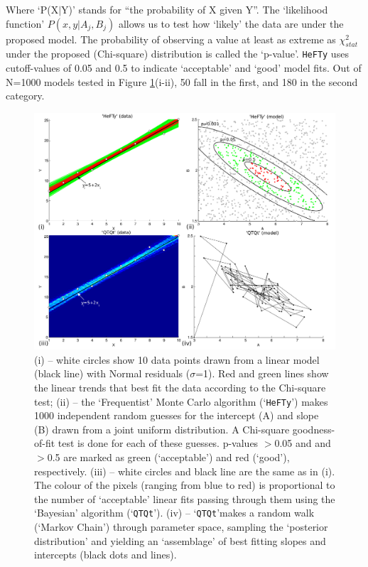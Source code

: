 \documentclass{article}
\begin{document}
Where `P(X$|$Y)' stands for ``the probability of X given Y''. The
`likelihood function' $P(x,y|A_j,B_j)$ allows us to test how `likely'
the data are under the proposed model.  The probability of observing a
value at least as extreme as $\chi^2_{stat}$ under the proposed
(Chi-square) distribution is called the `p-value'. {\tt HeFTy} uses
cutoff-values of 0.05 and 0.5 to indicate `acceptable' and `good'
model fits. Out of N=1000 models tested in Figure
\ref{fig:linear1}(i-ii), 50 fall in the first, and 180 in the second
category.\\

\begin{figure}[!ht]
\includegraphics[width=\textwidth]{fig2.png}
\caption{(i) -- white circles show 10 data points drawn from a linear
  model (black line) with Normal residuals ($\sigma$=1).  Red and
  green lines show the linear trends that best fit the data according
  to the Chi-square test; (ii) -- the `Frequentist' Monte Carlo
  algorithm (`{\tt HeFTy}') makes 1000 independent random guesses for
  the intercept (A) and slope (B) drawn from a joint uniform
  distribution. A Chi-square goodness-of-fit test is done for each of
  these guesses. p-values $>$0.05 and and $>$0.5 are marked as green
  (`acceptable') and red (`good'), respectively. (iii) -- white
  circles and black line are the same as in (i). The colour of the
  pixels (ranging from blue to red) is proportional to the number of
  `acceptable' linear fits passing through them using the `Bayesian'
  algorithm (`{\tt QTQt}').  (iv) -- `{\tt QTQt}'makes a random walk
  (`Markov Chain') through parameter space, sampling the `posterior
  distribution' and yielding an `assemblage' of best fitting slopes
  and intercepts (black dots and lines).}
\label{fig:linear1}
\end{figure}
\end{document}
